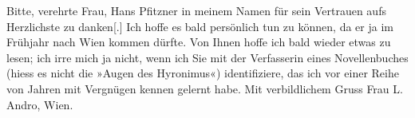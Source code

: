 \pstart
           Bitte, verehrte Frau, Hans Pfitzner in meinem
               Namen für sein Vertrauen aufs Herzlichste zu danken{[}.{]} Ich hoffe
               es bald persönlich tun zu können, da er ja im Frühjahr nach Wien kommen dürfte. Von Ihnen hoffe ich bald wieder etwas zu
               lesen; ich irre mich ja nicht, wenn ich Sie mit der Verfasserin eines Novellenbuches
               (hiess es nicht die »Augen des Hyronimus«) identifiziere, das ich vor einer Reihe von Jahren mit
               Vergnügen kennen gelernt habe.\pend
           \pstart Mit verbildlichem Gruss\pend{}{\vspace{1\baselineskip}}
\pstart
           \noindent{}Frau L. Andro, Wien.\pend
           \endnumbering{}  \newcommand{\dateiname}{L02574}\newcommand{\titel}{Arthur Schnitzler an Therese Rie-Andro, 12. 2. 1912}\newcommand{\editorInnen}{Martin Anton Müller und Gerd-Hermann Susen}
